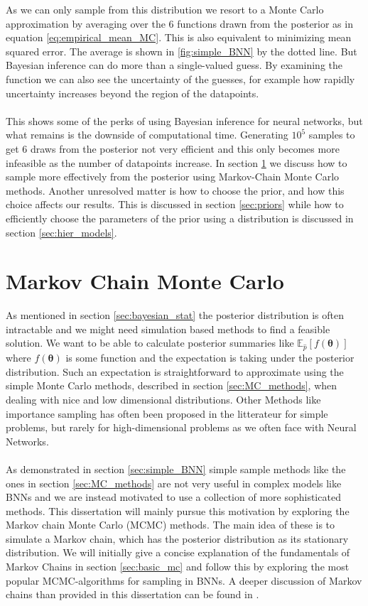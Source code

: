 As we can only sample from this distribution we resort to a Monte Carlo approximation by averaging over the 6 functions drawn from the posterior as in equation \ref{eq:empirical_mean_MC}. This is also equivalent to minimizing mean squared error. The average is shown in \ref{fig:simple_BNN} by the dotted line. But Bayesian inference can do more than a single-valued guess. By examining the function we can also see the uncertainty of the guesses, for example how rapidly uncertainty increases beyond the region of the datapoints. 
\\
\\
This shows some of the perks of using Bayesian inference for neural networks, but what remains is the downside of computational time. Generating $10^5$ samples to get 6 draws from the posterior not very efficient and this only becomes more infeasible as the number of datapoints increase. In section \ref{sec:MCMC} we discuss how to sample more effectively from the posterior using Markov-Chain Monte Carlo methods. Another unresolved matter is how to choose the prior, and how this choice affects our results. This is discussed in section \ref{sec:priors} while how to efficiently choose the parameters of the prior using a distribution is discussed in section \ref{sec:hier_models}.



\section{Markov Chain Monte Carlo}\label{sec:MCMC}
 As mentioned in section \ref{sec:bayesian_stat} the posterior distribution is often intractable and we might need simulation based methods to find a feasible solution. We want to be able to calculate posterior summaries like $\mathbb{E}_{\hat{p}}\left[f(\boldsymbol{\theta})\right]$ where $f(\boldsymbol{\theta})$ is some function and the expectation is taking under the posterior distribution. Such an expectation is straightforward to approximate using the simple Monte Carlo methods, described in section \ref{sec:MC_methods}, when dealing with nice and low dimensional distributions. Other Methods like importance sampling has often been proposed in the litterateur for simple problems, but rarely for high-dimensional problems as we often face with Neural Networks.
 \\
 \\
As demonstrated in section \ref{sec:simple_BNN} simple sample methods like the ones in section \ref{sec:MC_methods} are not very useful in complex models like BNNs and we are instead motivated to use a collection of more sophisticated methods. This dissertation will mainly pursue this motivation by exploring the Markov chain Monte Carlo (MCMC) methods. The main idea of these is to simulate a Markov chain, which has the posterior distribution as its stationary distribution. We will initially give a concise explanation of the fundamentals of Markov Chains in section \ref{sec:basic_mc} and follow this by exploring the most popular MCMC-algorithms for sampling in BNNs.
A deeper discussion of Markov chains than provided in this dissertation can be found in \cite{lawler2006introduction}.
 
